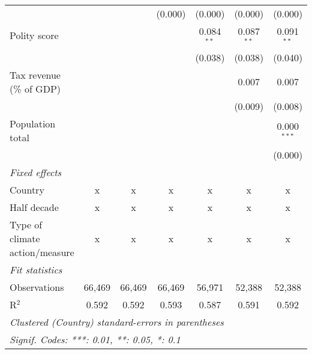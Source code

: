 \begin{tabular}{lcccccc}
                                                                         &             &                & (0.000)        & (0.000)        & (0.000)        & (0.000)\\   
   Polity score                                                          &             &                &                & 0.084$^{**}$   & 0.087$^{**}$   & 0.091$^{**}$\\   
                                                                         &             &                &                & (0.038)        & (0.038)        & (0.040)\\   
   Tax revenue (\% of GDP)                                               &             &                &                &                & 0.007          & 0.007\\   
                                                                         &             &                &                &                & (0.009)        & (0.008)\\   
   Population total                                                      &             &                &                &                &                & 0.000$^{***}$\\   
                                                                         &             &                &                &                &                & (0.000)\\   
   \emph{Fixed effects}\\
   Country                                                               & x           & x              & x              & x              & x              & x\\  
   Half decade                                                           & x           & x              & x              & x              & x              & x\\  
   Type of climate action/measure                                        & x           & x              & x              & x              & x              & x\\  
   \midrule \emph{Fit statistics}\\
   Observations                                                          & 66,469      & 66,469         & 66,469         & 56,971         & 52,388         & 52,388\\  
   R$^2$                                                                 & 0.592       & 0.592          & 0.593          & 0.587          & 0.591          & 0.592\\  
   \midrule
   \multicolumn{7}{l}{\emph{Clustered (Country) standard-errors in parentheses}}\\
   \multicolumn{7}{l}{\emph{Signif. Codes: ***: 0.01, **: 0.05, *: 0.1}}\\
\end{tabular}
\par\endgroup


